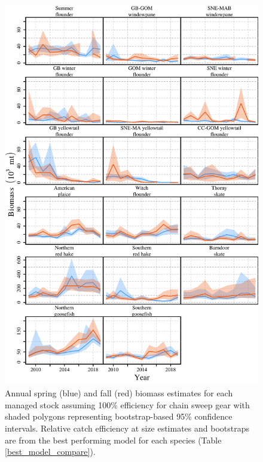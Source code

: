 \documentclass[
  12pt,
]{article}
\begin{document}
\begin{figure}
\caption{Annual spring (blue) and fall (red) biomass estimates for each managed stock assuming 100\% efficiency for chain sweep gear with shaded polygons representing bootstrap-based 95\% confidence intervals. Relative catch efficiency at size estimates and bootstraps are from the best performing model for each species (Table \ref{best_model_compare}).}\label{stock_biomass_plot}
\begin{center}
\includegraphics[height = 0.8\textheight]{stock_biomass_plot.pdf}
\end{center}
\end{figure}

\clearpage
\end{document}
